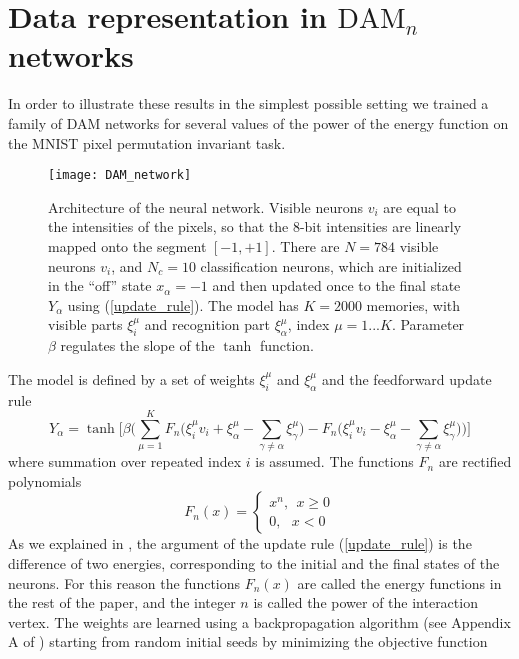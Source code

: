 \documentclass[12pt]{article} %
\begin{document}
 
 \section{Data representation in $\text{DAM}_n$ networks} \label{DAM networks}
In order to illustrate these results in the simplest possible setting we trained a family of DAM networks for several values of the power of the energy function on the MNIST pixel permutation invariant task. 
\begin{figure}[h]
\begin{center}
\texttt{[image: DAM\_network]}
\end{center}
\caption{\footnotesize{Architecture of the neural network. Visible neurons $v_i$ are equal to the intensities of the pixels, so that the $8$-bit intensities are linearly mapped onto the segment $[-1, +1]$. There are $N=784$ visible neurons $v_i$, and $N_c=10$ classification neurons, which are initialized in the ``off'' state $x_\alpha=-1$ and then updated once to the final state $Y_\alpha$ using (\ref{update_rule}). The model has $K=2000$ memories, with visible parts $\xi^\mu_i$ and recognition part $\xi^\mu_\alpha$, index $\mu=1...K$. Parameter $\beta$ regulates the slope of the $\tanh$ function.}}\label{architecture}
\vspace{-0.0cm}
\end{figure}
 The model is defined by  a set of weights $\xi^\mu_i$ and $\xi^\mu_\alpha$ and the feedforward update rule
 \begin{equation}
Y_\alpha=\tanh\Big[ \beta \Big(\sum\limits_{\mu=1}^K F_n\big(\xi^\mu_i v_i + \xi^\mu_\alpha - \sum\limits_{\gamma \neq \alpha} \xi^\mu_\gamma  \big) -F_n\big(\xi^\mu_i v_i - \xi^\mu_\alpha - \sum\limits_{\gamma \neq \alpha} \xi^\mu_\gamma\big)  \Big)\Big] \label{update_rule}
\end{equation}
where summation over repeated index $i$ is assumed. The functions $F_n$ are rectified polynomials~\cite{Krotov Hopfield}
\begin{equation}\label{rect_polynom} 
 F_n(x)=\begin{cases}x^n,  \ \ x\geq0\\
0, \ \ \ x<0
\end{cases}
\end{equation} 
As we explained in \cite{Krotov Hopfield}, the argument of the update rule (\ref{update_rule}) is the difference of two energies, corresponding to the initial and the final states of the neurons. For this reason the functions $F_n(x)$ are called the energy functions in the rest of the paper, and the integer $n$ is called the power of the interaction vertex. The weights are learned using a backpropagation algorithm (see Appendix A of \cite{Krotov Hopfield}) starting from random initial seeds by minimizing the objective function
\end{document}
